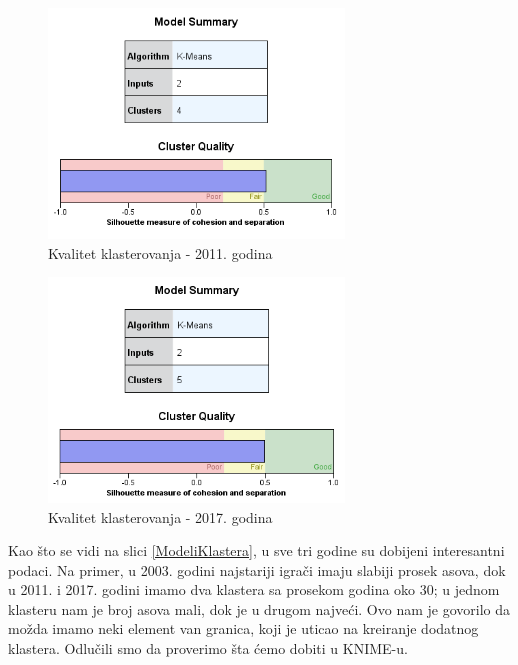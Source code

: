 \documentclass[a4paper]{article}
\begin{document}
\restoregeometry
\begin{figure}[H]
	\begin{center}
		\includegraphics[width=0.7\textwidth]{Klasterovanje/Model_KMeans2011_Silhouette.png}
	\end{center}
	\caption{Kvalitet klasterovanja - 2011. godina}
	\label{fig:SPSS_Silueta2011}
\end{figure}

\begin{figure}[H]
	\begin{center}
		\includegraphics[width=0.7\textwidth]{Klasterovanje/Model_KMeans2017_Silhouette.png}
	\end{center}
	\caption{Kvalitet klasterovanja - 2017. godina}
	\label{fig:SPSS_Silueta2017}
\end{figure}

Kao što se vidi na slici \ref{ModeliKlastera}, u sve tri godine su dobijeni interesantni podaci. Na primer, u 2003. godini najstariji igrači imaju slabiji prosek asova, dok u 2011. i 2017. godini imamo dva klastera sa prosekom godina oko 30; u jednom klasteru nam je broj asova mali, dok je u drugom najveći. Ovo nam je govorilo da možda imamo neki element van granica, koji je uticao na kreiranje dodatnog klastera. Odlučili smo da proverimo šta ćemo dobiti u KNIME-u.
\end{document}
